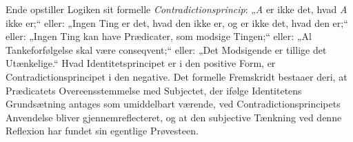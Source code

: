\documentclass[12pt]{book}
\begin{document}
Ende opstiller Logiken sit formelle \emph{Contradictionsprincip}: „\textit{A} er
ikke det, hvad \textit{A} ikke er;“ eller: „Ingen Ting er det, hvad den ikke er,
og er ikke det, hvad den er;“ eller: „Ingen Ting kan have Prædicater, som
modsige Tingen;“ eller: „Al Tankeforfølgelse skal være conseqvent;“ eller: „Det
Modsigende er tillige det Utænkelige.“ Hvad Identitetsprincipet er i den
positive Form, er Contradictionsprincipet i den negative. Det formelle
Fremskridt bestaaer deri, at Prædicatets Overeensstemmelse med Subjectet, der
ifølge Identitetens Grundsætning antages som umiddelbart værende, ved
Contradictionsprincipets Anvendelse bliver gjennemreflecteret, og at den
subjective Tænkning ved denne Reflexion har fundet sin egentlige Prøvesteen.
\end{document}
